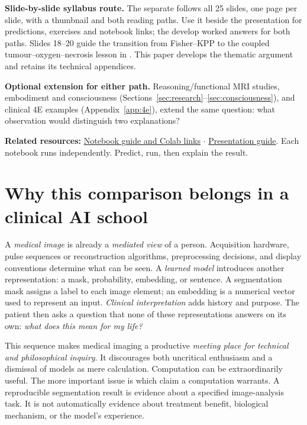 \documentclass[11pt,a4paper]{article}
\begin{document}
\textbf{Slide-by-slide syllabus route.} The separate  follows all 25 slides, one page per slide, with a thumbnail and both reading paths. Use it beside the presentation for predictions, exercises and notebook links; the  develop worked answers for both paths. Slides 18--20 guide the transition from Fisher--KPP to the coupled tumour--oxygen--necrosis lesson in . This paper develops the thematic argument and retains its technical appendices.

\textbf{Optional extension for either path.} Reasoning/functional MRI studies, embodiment and consciousness (Sections~\ref{sec:research}--\ref{sec:consciousness}), and clinical 4E examples (Appendix~\ref{app:4e}), extend the same question: what observation would distinguish two explanations?

\textbf{Related resources:} \href{https://github.com/arvidl/brains-to-models/blob/main/code/notebooks/README.md}{Notebook guide and Colab links} $\cdot$ \href{https://github.com/arvidl/brains-to-models/blob/main/talk/resources.md}{Presentation guide}. Each notebook runs independently. Predict, run, then explain the result.
\endgroup
\clearpage

\section{Why this comparison belongs in a clinical AI school}\label{sec:why}
A \emph{medical image} is already a \emph{mediated view} of a person. Acquisition hardware, pulse sequences or reconstruction algorithms, preprocessing decisions, and display conventions determine what can be seen. A \emph{learned model} introduces another representation: a mask, probability, embedding, or sentence. A segmentation mask assigns a label to each image element; an embedding is a numerical vector used to represent an input. \emph{Clinical interpretation} adds history and purpose. The patient then asks a question that none of these representations answers on its own: \emph{what does this mean for my life?}

This sequence makes medical imaging a productive \emph{meeting place for technical and philosophical inquiry}. It discourages both uncritical enthusiasm and a dismissal of models as mere calculation. Computation can be extraordinarily useful. The more important issue is which claim a computation warrants. A reproducible segmentation result is evidence about a specified image-analysis task. It is not automatically evidence about treatment benefit, biological mechanism, or the model's experience.
\end{document}
